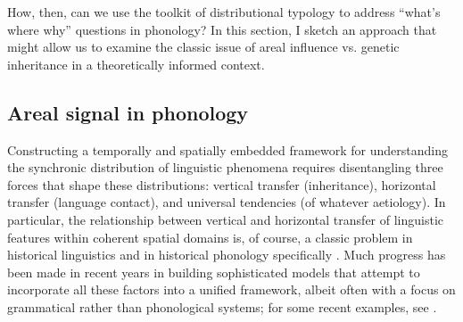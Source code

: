 \documentclass[output=paper,colorlinks,citecolor=brown]{langscibook}
\begin{document}
How, then, can we use the toolkit of distributional typology to address \enquote{what's where why} questions in phonology? In this section, I sketch an approach that might allow us to examine the classic issue of areal influence vs. genetic inheritance in a theoretically informed context.

\subsection{Areal signal in phonology}
\label{sec:areal-sign-phon}

Constructing a temporally and spatially embedded framework for understanding the synchronic distribution of linguistic phenomena requires disentangling three forces that shape these distributions: vertical transfer (inheritance), horizontal transfer (language contact), and universal tendencies (of whatever aetiology). In particular, the relationship between vertical and horizontal transfer of linguistic features within coherent spatial domains is, of course, a classic problem in historical linguistics and in historical phonology specifically \parencite[cf. for some recent discussions][]{françois2015trees, jacques2019save}. Much progress has been made in recent years in building sophisticated models that attempt to incorporate all these factors into a unified framework, albeit often with a focus on grammatical rather than phonological systems; for some recent examples, see \textcite{Cathcart2018, dedio2019evidence, ranacher2021contact}.
\end{document}

